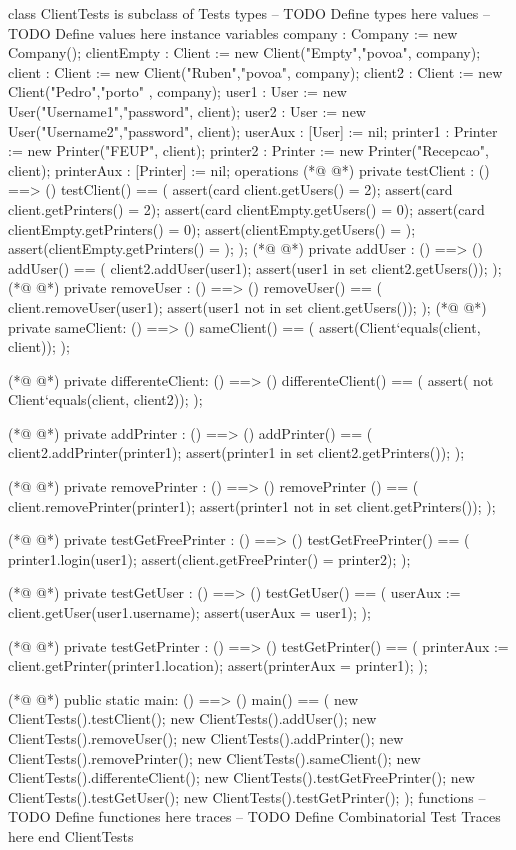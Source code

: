 \begin{vdmpp}[breaklines=true]
class ClientTests is subclass of Tests
types
-- TODO Define types here
values
-- TODO Define values here
instance variables
company : Company := new Company();
clientEmpty : Client := new Client("Empty","povoa", company);
client : Client := new Client("Ruben","povoa", company);
client2 : Client := new Client("Pedro","porto" , company);
user1 : User := new User("Username1","password", client);
user2 : User := new User("Username2","password", client);
userAux : [User] := nil;
printer1 : Printer := new Printer("FEUP", client);
printer2 : Printer := new Printer("Recepcao", client);
printerAux : [Printer] := nil;
operations
(*@
\label{testClient:18}
@*)
private testClient : () ==> ()
testClient() ==
(
 assert(card client.getUsers() = 2);
 assert(card client.getPrinters() = 2);
 assert(card clientEmpty.getUsers() = 0);
 assert(card clientEmpty.getPrinters() = 0);
 assert(clientEmpty.getUsers() = {});
 assert(clientEmpty.getPrinters() = {});
);
(*@
\label{addUser:28}
@*)
private addUser : () ==> ()
addUser() == 
(
 client2.addUser(user1);
 assert(user1  in set client2.getUsers());
);
(*@
\label{removeUser:34}
@*)
private removeUser : () ==> ()
removeUser() == 
(
 client.removeUser(user1);
 assert(user1 not in set client.getUsers());
);
(*@
\label{sameClient:40}
@*)
private sameClient: () ==> ()
sameClient() == 
(
 assert(Client`equals(client, client));
);

(*@
\label{differenteClient:46}
@*)
private differenteClient: () ==> ()
differenteClient() == 
(
 assert( not Client`equals(client, client2));
);

(*@
\label{addPrinter:52}
@*)
private addPrinter : () ==> ()
addPrinter() == 
(
 client2.addPrinter(printer1);
 assert(printer1  in set client2.getPrinters());
);

(*@
\label{removePrinter:59}
@*)
private removePrinter : () ==> ()
removePrinter () == 
(
 client.removePrinter(printer1);
 assert(printer1 not in set client.getPrinters());
);

(*@
\label{testGetFreePrinter:66}
@*)
private testGetFreePrinter : () ==> ()
testGetFreePrinter() == 
(
printer1.login(user1);
assert(client.getFreePrinter() = printer2);
);

(*@
\label{testGetUser:73}
@*)
private testGetUser : () ==> ()
testGetUser() == 
(
 userAux := client.getUser(user1.username);
 assert(userAux = user1);
);

(*@
\label{testGetPrinter:80}
@*)
private testGetPrinter : () ==> ()
testGetPrinter() == 
(
 printerAux := client.getPrinter(printer1.location);
 assert(printerAux = printer1);
);


(*@
\label{main:88}
@*)
public static main: () ==> ()
 main() ==
 (
  new ClientTests().testClient();
  new ClientTests().addUser();
  new ClientTests().removeUser();
  new ClientTests().addPrinter();
  new ClientTests().removePrinter();
  new ClientTests().sameClient();
  new ClientTests().differenteClient();
  new ClientTests().testGetFreePrinter();
  new ClientTests().testGetUser();
  new ClientTests().testGetPrinter();
 );
functions
-- TODO Define functiones here
traces
-- TODO Define Combinatorial Test Traces here
end ClientTests
\end{vdmpp}
